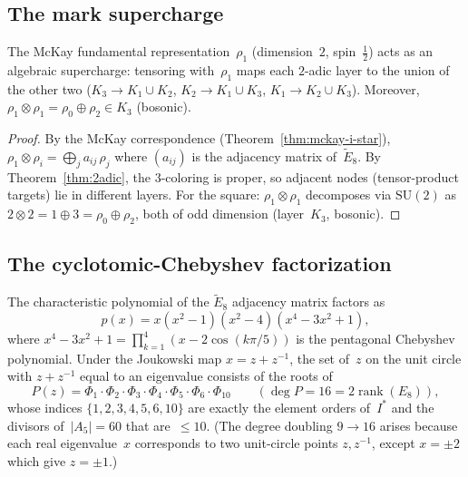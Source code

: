\subsection{The mark supercharge}
\label{sec:supercharge}

\begin{theorem}\label{thm:supercharge}
The McKay fundamental representation~$\rho_1$ (dimension~$2$, spin~$\tfrac12$)
acts as an algebraic supercharge: tensoring with~$\rho_1$ maps each
$2$-adic layer to the union of the other two
($K_3 \to K_1 \cup K_2$, $K_2 \to K_1 \cup K_3$, $K_1 \to K_2 \cup K_3$).  Moreover,
$\rho_1 \otimes \rho_1 = \rho_0 \oplus \rho_2 \in K_3$ (bosonic).
\end{theorem}

\begin{proof}
By the McKay correspondence (Theorem~\ref{thm:mckay-i-star}),
$\rho_1 \otimes \rho_i = \bigoplus_j a_{ij}\,\rho_j$
where $(a_{ij})$ is the adjacency matrix of~$\tilde{E}_8$.
By Theorem~\ref{thm:2adic}, the $3$-coloring is proper,
so adjacent nodes (tensor-product targets) lie in different layers.
For the square: $\rho_1 \otimes \rho_1$ decomposes via $\mathrm{SU}(2)$
as $2 \otimes 2 = 1 \oplus 3 = \rho_0 \oplus \rho_2$,
both of odd dimension (layer~$K_3$, bosonic).
\end{proof}

\subsection{The cyclotomic-Chebyshev factorization}
\label{sec:cyclotomic}

\begin{theorem}\label{thm:cyclotomic}
The characteristic polynomial of the $\tilde{E}_8$ adjacency matrix factors as
\begin{equation}\label{eq:char-poly}
  p(x) = x(x^2-1)(x^2-4)(x^4-3x^2+1),
\end{equation}
where $x^4 - 3x^2 + 1 = \prod_{k=1}^{4}(x - 2\cos(k\pi/5))$ is the
pentagonal Chebyshev polynomial.
Under the Joukowski map $x = z + z^{-1}$, the set of~$z$ on the
unit circle with $z + z^{-1}$ equal to an eigenvalue consists of
the roots of
\begin{equation}\label{eq:cyclotomic}
  P(z) = \Phi_1 \cdot \Phi_2 \cdot \Phi_3 \cdot \Phi_4 \cdot \Phi_5 \cdot \Phi_6 \cdot \Phi_{10}
  \qquad(\deg P = 16 = 2\operatorname{rank}(E_8)),
\end{equation}
whose indices $\{1,2,3,4,5,6,10\}$ are exactly the element orders of~$I^*$
and the divisors of~$|A_5| = 60$ that are~$\leq 10$.
(The degree doubling $9 \to 16$ arises because each real eigenvalue~$x$
corresponds to two unit-circle points $z, z^{-1}$, except $x = \pm 2$
which give $z = \pm 1$.)
\end{theorem}

